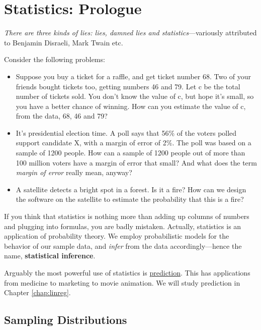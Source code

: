 \chapter{Statistics:  Prologue}
\label{chap:statprologue} 

{\it There are three kinds of lies:  lies, damned lies and
statistics}---variously attributed to Benjamin Disraeli, Mark Twain etc. 

Consider the following problems:

\begin{itemize}

\item Suppose you buy a ticket for a raffle, and get ticket number 68.
Two of your friends bought tickets too, getting numbers 46 and 79.  Let
c be the total number of tickets sold.  You don't know the value of c,
but hope it's small, so you have a better chance of winning.  How can
you estimate the value of c, from the data, 68, 46 and 79?

\item It's presidential election time.  A poll says that 56\% of the
voters polled support candidate X, with a margin of error of 2\%.  The
poll was based on a sample of 1200 people.  How can a sample of 1200
people out of more than 100 million voters have a margin of error that
small?  And what does the term {\it margin of error} really mean,
anyway?

\item A satellite detects a bright spot in a forest.  Is it a fire?  How
can we design the software on the satellite to estimate the probability
that this is a fire?

\end{itemize}

If you think that statistics is nothing more than adding up columns of
numbers and plugging into formulas, you are badly mistaken.  Actually,
statistics is an application of probability theory.  We employ
probabilistic models for the behavior of our sample data, and {\it infer}
from the data accordingly---hence the name, {\bf statistical inference}. 

Arguably the most powerful use of statistics is \underline{prediction}.
This has applications from medicine to marketing to movie animation.  We
will study prediction in Chapter \ref{chap:linreg}.

\section{Sampling Distributions}
\label{startcrucial}

